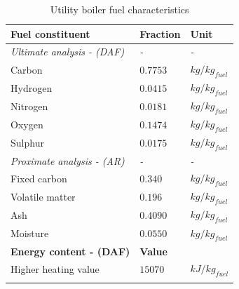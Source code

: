 \documentclass[twocolumn,10pt]{asme2ej}
\begin{document}
\begin{table}[h!]
\centering
\caption{Utility boiler fuel characteristics}
\vspace{2mm}
\label{tbl_fuel}
\begin{tabularx}{3.25in}{p{1.5in} p{0.8in} l}
\hline
\textbf{Fuel constituent} & \textbf{Fraction} & \textbf{Unit}\\
\hline
\textit{Ultimate analysis - (DAF)} & \textit{-} & \textit{-}\\
Carbon & $0.7753$ & $kg/kg_{fuel}$\\
Hydrogen & $0.0415$ & $kg/kg_{fuel}$\\
Nitrogen & $0.0181$ & $kg/kg_{fuel}$\\
Oxygen & $0.1474$ & $kg/kg_{fuel}$\\
Sulphur & $0.0175$ & $kg/kg_{fuel}$\\
\textit{Proximate analysis - (AR)} & \textit{-} & \textit{-}\\
Fixed carbon & $0.340$ & $kg/kg_{fuel}$\\
Volatile matter & $0.196$ & $kg/kg_{fuel}$\\
Ash & $0.4090$ & $kg/kg_{fuel}$\\
Moisture & $0.0550$ & $kg/kg_{fuel}$\\
\hline
\textbf{Energy content - (DAF)} & \textbf{Value} &\\
\hline
Higher heating value & $15070$ & $kJ/kg_{fuel}$\\
\hline
\vspace{0pt}
\end{tabularx}
\end{table}
\end{document}
